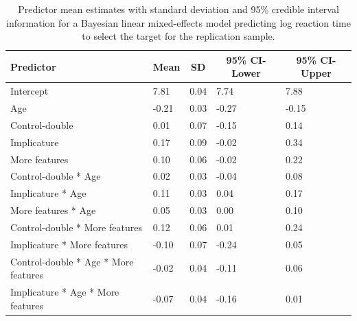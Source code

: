 \documentclass[man]{apa6}
\begin{document}
\begin{table}[tbp]
\begin{center}
\begin{threeparttable}
\caption{\label{tab:brmrtSample2}Predictor mean estimates with standard deviation and 95\% credible interval information for a Bayesian linear mixed-effects model predicting log reaction time to select the target for the replication sample.}
\begin{tabular}{lllll}
\toprule
Predictor & \multicolumn{1}{c}{Mean} & \multicolumn{1}{c}{SD} & \multicolumn{1}{c}{95\% CI-Lower} & \multicolumn{1}{c}{95\% CI-Upper}\\
\midrule
Intercept & 7.81 & 0.04 & 7.74 & 7.88\\
Age & -0.21 & 0.03 & -0.27 & -0.15\\
Control-double & 0.01 & 0.07 & -0.15 & 0.14\\
Implicature & 0.17 & 0.09 & -0.02 & 0.34\\
More features & 0.10 & 0.06 & -0.02 & 0.22\\
Control-double * Age & 0.02 & 0.03 & -0.04 & 0.08\\
Implicature * Age & 0.11 & 0.03 & 0.04 & 0.17\\
More features * Age & 0.05 & 0.03 & 0.00 & 0.10\\
Control-double * More features & 0.12 & 0.06 & 0.01 & 0.24\\
Implicature * More features & -0.10 & 0.07 & -0.24 & 0.05\\
Control-double * Age * More features & -0.02 & 0.04 & -0.11 & 0.06\\
Implicature * Age * More features & -0.07 & 0.04 & -0.16 & 0.01\\
\bottomrule
\end{tabular}
\end{threeparttable}
\end{center}
\end{table}
\end{document}
